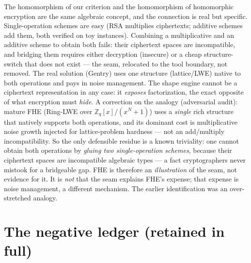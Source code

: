 \documentclass[11pt]{article}
\begin{document}
The homomorphism of our criterion and the homomorphism of homomorphic encryption are the same algebraic
concept, and the connection is real but specific. Single-operation schemes are easy (RSA multiplies
ciphertexts; additive schemes add them, both verified on toy instances). Combining a multiplicative and an
additive scheme to obtain both fails: their ciphertext spaces are incompatible, and bridging them requires
either decryption (insecure) or a cheap structure-switch that does not exist --- the seam, relocated to the
tool boundary, not removed. The real solution (Gentry) uses one structure (lattice/LWE) native to both
operations and pays in noise management. The shape engine cannot be a ciphertext representation in any case:
it \emph{exposes} factorization, the exact opposite of what encryption must \emph{hide}. A correction on the
analogy (adversarial audit): mature FHE (Ring-LWE over $\mathbb{Z}_q[x]/(x^N+1)$) uses a \emph{single} rich
structure that natively supports both operations, and its dominant cost is multiplicative noise growth
injected for lattice-problem hardness --- not an add/multiply incompatibility. So the only defensible residue is a
known triviality: one cannot obtain both operations by \emph{gluing two single-operation schemes}, because
their ciphertext spaces are incompatible algebraic types --- a fact cryptographers never mistook for a
bridgeable gap. FHE is therefore an \emph{illustration} of the seam, not evidence for it. It is \emph{not}
that the seam explains FHE's expense; that expense
is noise management, a different mechanism. The earlier identification was an over-stretched analogy.

\section{The negative ledger (retained in full)}
\end{document}
